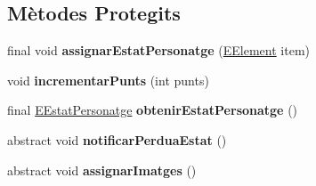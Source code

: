 \subsection*{Mètodes Protegits}
\begin{DoxyCompactItemize}
\item 
\hypertarget{classlogica_1_1_personatge_a8b39023213405003380501bff8fdee6b}{final void {\bfseries assignar\+Estat\+Personatge} (\hyperlink{enumlogica_1_1enumeracions_1_1_e_element}{E\+Element} item)}\label{classlogica_1_1_personatge_a8b39023213405003380501bff8fdee6b}

\item 
\hypertarget{classlogica_1_1_personatge_a72434a1f940bd10caa6e2d80b129adda}{void {\bfseries incrementar\+Punts} (int punts)}\label{classlogica_1_1_personatge_a72434a1f940bd10caa6e2d80b129adda}

\item 
\hypertarget{classlogica_1_1_personatge_aa82af20d5b19f0a0401614ec642be499}{final \hyperlink{enumlogica_1_1_personatge_1_1_e_estat_personatge}{E\+Estat\+Personatge} {\bfseries obtenir\+Estat\+Personatge} ()}\label{classlogica_1_1_personatge_aa82af20d5b19f0a0401614ec642be499}

\item 
\hypertarget{classlogica_1_1_personatge_add25ab819bc64920f353eedeac26efcf}{abstract void {\bfseries notificar\+Perdua\+Estat} ()}\label{classlogica_1_1_personatge_add25ab819bc64920f353eedeac26efcf}

\item 
\hypertarget{classlogica_1_1_personatge_ae7f9cdfd1b01d6c7eaee1675decfaeca}{abstract void {\bfseries assignar\+Imatges} ()}\label{classlogica_1_1_personatge_ae7f9cdfd1b01d6c7eaee1675decfaeca}

\end{DoxyCompactItemize}
